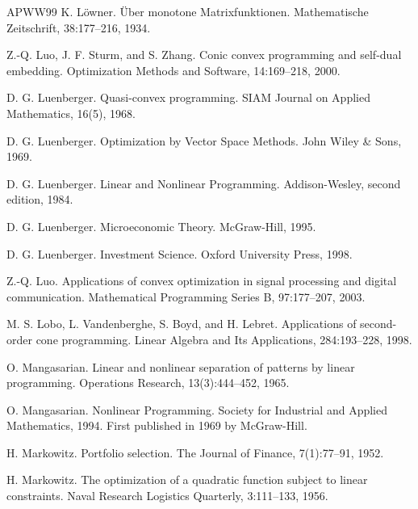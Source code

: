 \begin{thebibliography}{APWW99}
 K. Löwner. Über monotone Matrixfunktionen. Mathematische Zeitschrift, 38:177–216, 1934.

 Z.-Q. Luo, J. F. Sturm, and S. Zhang. Conic convex programming and self-dual embedding. Optimization Methods and Software, 14:169–218, 2000.

 D. G. Luenberger. Quasi-convex programming. SIAM Journal on Applied Mathematics, 16(5), 1968.

 D. G. Luenberger. Optimization by Vector Space Methods. John Wiley \& Sons, 1969.

 D. G. Luenberger. Linear and Nonlinear Programming. Addison-Wesley, second edition, 1984.

 D. G. Luenberger. Microeconomic Theory. McGraw-Hill, 1995.

 D. G. Luenberger. Investment Science. Oxford University Press, 1998.

 Z.-Q. Luo. Applications of convex optimization in signal processing and digital communication. Mathematical Programming Series B, 97:177–207, 2003.

 M. S. Lobo, L. Vandenberghe, S. Boyd, and H. Lebret. Applications of second-order cone programming. Linear Algebra and Its Applications, 284:193–228, 1998.

 O. Mangasarian. Linear and nonlinear separation of patterns by linear programming. Operations Research, 13(3):444–452, 1965.

 O. Mangasarian. Nonlinear Programming. Society for Industrial and Applied Mathematics, 1994. First published in 1969 by McGraw-Hill.

 H. Markowitz. Portfolio selection. The Journal of Finance, 7(1):77–91, 1952.

 H. Markowitz. The optimization of a quadratic function subject to linear constraints. Naval Research Logistics Quarterly, 3:111–133, 1956.


\end{thebibliography}
